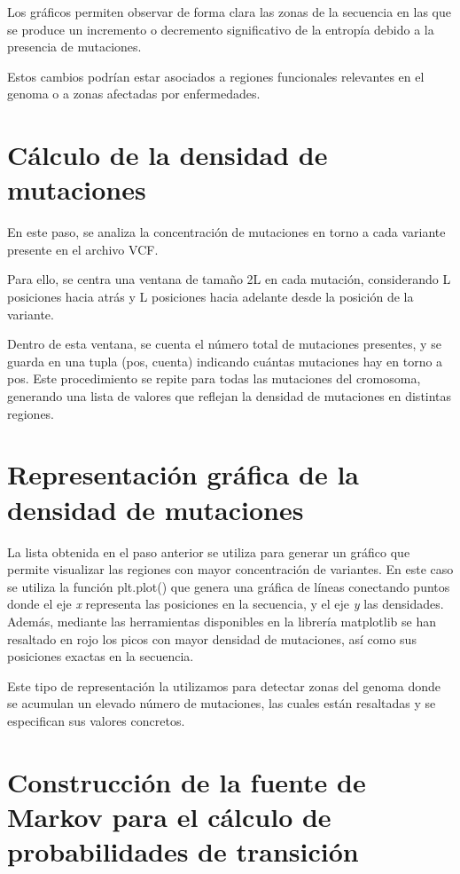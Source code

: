 \documentclass[11pt,spanish,listoffigures,listoftables]{tfgetsinf}
\begin{document}
Los gráficos permiten observar de forma clara las zonas de la secuencia en las que se produce un incremento o decremento significativo de la entropía debido a la presencia de mutaciones. 

Estos cambios podrían estar asociados a regiones funcionales relevantes en el genoma o a zonas afectadas por enfermedades. 

\section{Cálculo de la densidad de mutaciones}

En este paso, se analiza la concentración de mutaciones en torno a cada variante presente en el archivo \acs{VCF}. 

Para ello, se centra una ventana de tamaño 2L en cada mutación, considerando L posiciones hacia atrás y L posiciones hacia adelante desde la posición de la variante. 

Dentro de esta ventana, se cuenta el número total de mutaciones presentes, y se guarda en una tupla (pos, cuenta) indicando cuántas mutaciones hay en torno a pos. Este procedimiento se repite para todas las mutaciones del cromosoma, generando una lista de valores que reflejan la densidad de mutaciones en distintas regiones. 

\section{Representación gráfica de la densidad de mutaciones}

La lista obtenida en el paso anterior se utiliza para generar un gráfico que permite visualizar las regiones con mayor concentración de variantes. En este caso se utiliza la función plt.plot() que genera una gráfica de líneas conectando puntos donde el eje \textit{x} representa las posiciones en la secuencia, y el eje \textit{y} las densidades. Además, mediante las herramientas disponibles en la librería matplotlib se han resaltado en rojo los picos con mayor densidad de mutaciones, así como sus posiciones exactas en la secuencia.

Este tipo de representación la utilizamos para detectar zonas del genoma donde se acumulan un elevado número de mutaciones, las cuales están resaltadas y se especifican sus valores concretos.

\section{Construcción de la fuente de Markov para el cálculo de probabilidades de transición}
\end{document}
